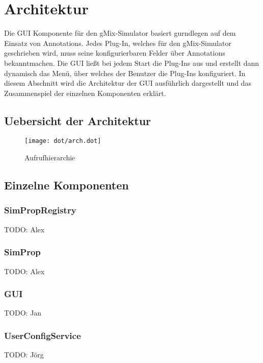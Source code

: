 \documentclass[a4paper, 11pt]{article} %
\begin{document}

\section{Architektur} %
\label{sec:architektur}
Die GUI Komponente für den gMix-Simulator basiert gurndlegen auf dem Einsatz von Annotations. Jedes Plug-In, welches für den gMix-Simulator geschrieben wird, muss seine konfigurierbaren Felder über Annotations bekanntmachen. Die GUI ließt bei jedem Start die Plug-Ins aus und erstellt dann dynamisch das Menü, über welches der Benutzer die Plug-Ins konfiguriert. In diesem Abschnitt wird die Architektur der GUI ausführlich dargestellt und das Zusammenspiel der einzelnen Komponenten erklärt.

\subsection{Uebersicht der Architektur} %
\label{ssub:uebersicht}

\begin{figure}[!htp]
\texttt{[image: dot/arch.dot]}
\caption{Aufrufhierarchie}
\label{fig:callgraph}
\end{figure}


\subsection{Einzelne Komponenten} %
\label{ssub:einzelne_komponenten}

\subsubsection{SimPropRegistry}
\label{sssub:simpropregistry}
TODO: Alex

\subsubsection{SimProp} %
\label{ssub:simprop}
TODO: Alex

\subsubsection{GUI}
\label{sssub:guiservice}
TODO: Jan

\subsubsection{UserConfigService} %
\label{ssub:userconfigservice}
TODO: Jörg
\end{document}
